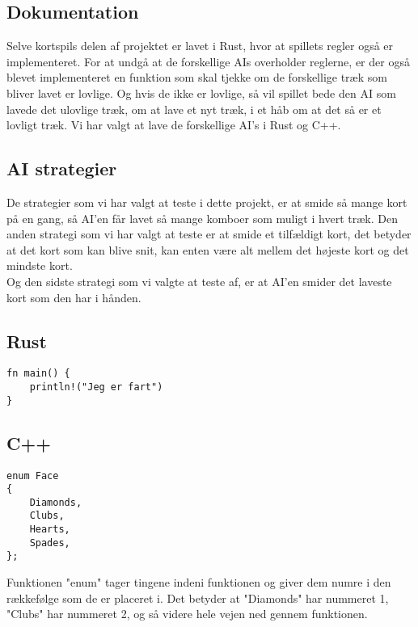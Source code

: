 \documentclass[a4paper, 12pt]{article}
\begin{document}
\begin{multicols}{2}
\vfill

\section{Dokumentation}

Selve kortspils delen af projektet er lavet i Rust, hvor at spillets regler også er implementeret. For at undgå at de forskellige AIs overholder reglerne, er der også blevet implementeret en funktion som skal tjekke om de forskellige træk som bliver lavet er lovlige. Og hvis de ikke er lovlige, så vil spillet bede den AI som lavede det ulovlige træk, om at lave et nyt træk, i et håb om at det så er et lovligt træk. Vi har valgt at lave de forskellige AI's i Rust og C++.

\vfill

\subsection{AI strategier}
De strategier som vi har valgt at teste i dette projekt, er at smide så mange kort på en gang, så AI'en får lavet så mange komboer som muligt i hvert træk. Den anden strategi som vi har valgt at teste er at smide et tilfældigt kort, det betyder at det kort som kan blive snit, kan enten være alt mellem det højeste kort og det mindste kort. \\
Og den sidste strategi som vi valgte at teste af, er at AI'en smider det laveste kort som den har i hånden. 

\vfill
\pagebreak
\end{multicols}

\subsection{Rust}

\begin{verbatim}
fn main() {
	println!("Jeg er fart")
}
\end{verbatim}

\subsection{C++}

\begin{verbatim}
enum Face
{
	Diamonds,
	Clubs,
	Hearts,
	Spades,
};
\end{verbatim}
Funktionen "enum" tager tingene indeni funktionen og giver dem numre i den rækkefølge som de er placeret i. Det betyder at "Diamonds" har nummeret 1, "Clubs" har nummeret 2, og så videre hele vejen ned gennem funktionen.
\bigbreak
\end{document}
